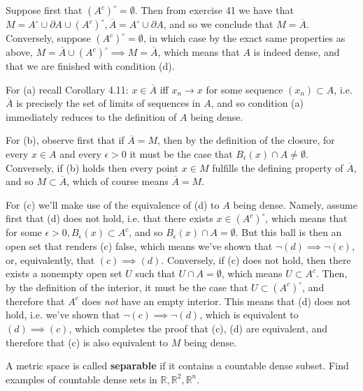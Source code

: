 \begin{solution}
    
    Suppose first that $(A^c)^\circ = \emptyset$.
    Then from exercise 41 we have that $M = A^\circ \cup \partial A \cup (A^c)^\circ, \overline{A} = A^\circ \cup \partial A$, and so we conclude that $M = \overline{A}$.
    Conversely, suppose $(A^c)^\circ = \emptyset$, in which case by the exact same properties as above, $M = \overline{A} \cup (A^c)^\circ \implies M = \overline{A}$, which means that $A$ is indeed dense, and that we are finished with condition (d).

    For (a) recall Corollary 4.11: $x \in \overline{A}$ iff $x_n \rightarrow x$ for some sequence $(x_n) \subset A$, i.e. $\overline{A}$ is precisely the set of limits of sequences in $A$, and so condition (a) immediately reduces to the definition of $A$ being dense.
    
    For (b), observe first that if $\overline{A} = M$, then by the definition of the closure, for every $x \in A$ and every $\epsilon > 0$ it must be the case that $B_{\epsilon}(x) \cap A \neq \emptyset$.
    Conversely, if (b) holds then every point $x \in M$ fulfills the defining property of $\overline{A}$, and so $M \subset \overline{A}$, which of course means $\overline{A} = M$.

    For (c) we'll make use of the equivalence of (d) to $A$ being dense.
    Namely, assume first that (d) does not hold, i.e. that there exists $x \in (A^c)^\circ$, which means that for some $\epsilon > 0, B_{\epsilon}(x) \subset A^c$, and so $B_{\epsilon}(x) \cap A = \emptyset$.
    But this ball is then an open set that renders (c) false, which means we've shown that $\neg (d) \implies \neg (c)$, or, equivalently, that $(c) \implies (d)$.
    Conversely, if (c) does not hold, then there exists a nonempty open set $U$ such that $U \cap A = \emptyset$, which means $U \subset A^c$.
    Then, by the definition of the interior, it must be the case that $U \subset (A^c)^\circ$, and therefore that $A^c$ does \textit{not} have an empty interior.
    This means that (d) does not hold, i.e. we've shown that $ \neg (c) \implies \neg (d)$, which is equivalent to $(d) \implies (c)$, which completes the proof that (c), (d) are equivalent, and therefore that (c) is also equivalent to $M$ being dense.
\end{solution}

\begin{exercise}{48}
    A metric space is called \textbf{separable} if it contains a countable dense subset.
    Find examples of countable dense sets in $\mathbb{R}, \mathbb{R}^2, \mathbb{R}^n$.
\end{exercise}

